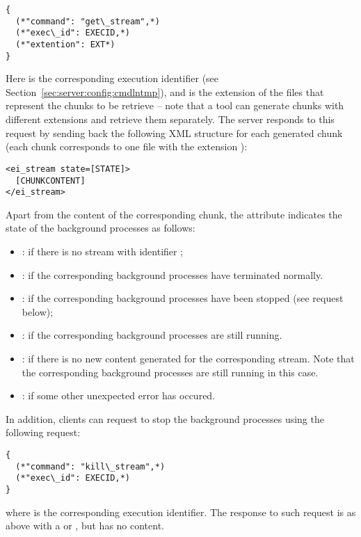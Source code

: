 \medskip
\begin{lstlisting}
{
  (*"command": "get\_stream",*)
  (*"exec\_id": EXECID,*)
  (*"extention": EXT*)
}
\end{lstlisting}

\medskip
\noindent
Here  is the corresponding execution identifier (see
Section~\ref{sec:server:config:cmdlntmp}), and  is the
extension of the files that represent the chunks to be retrieve --
note that a tool can generate chunks with different extensions and
retrieve them separately.
%
The server responds to this request by sending back the following XML
structure for each generated chunk (each chunk corresponds to one file
with the extension ):

\medskip
\begin{lstlisting}
<ei_stream state=[STATE]>
  [CHUNKCONTENT]
</ei_stream>
\end{lstlisting}

\medskip 
\noindent
Apart from the content of the corresponding chunk, the attribute
 indicates the state of the background processes
as follows:
%
\begin{itemize}
  \item {}: if there is no stream with identifier ;
  \item {}: if the corresponding background processes
    have terminated normally.
  \item {}: if the corresponding background processes have
    been stopped (see  request below);
  \item {}: if the corresponding background processes are
    still running.
  \item {}: if there is no new content generated for the
    corresponding stream. Note that the corresponding background
    processes are still running in this case.
  \item {}: if some other unexpected  error has occured.
\end{itemize}
%
%
In addition, clients can request to stop the background processes
using the following request:

\medskip
\begin{lstlisting}
{
  (*"command": "kill\_stream",*)
  (*"exec\_id": EXECID,*)
}
\end{lstlisting}

\medskip 
\noindent
where  is the corresponding execution identifier. The
response to such request is as above with a 
 or , but has no content.

